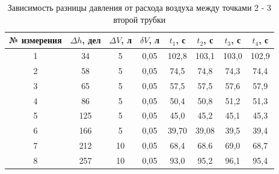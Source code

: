 \documentclass[11pt,a4paper]{article}
\begin{document}
\begin{enumerate}
\begin{table}[h!]
\centering
\begin{tabular}{|c|c|c|c|c|c|c|c|}
\hline
№ измерения & $\Delta h$, дел & $\Delta V$, л & $\delta V$, л & $t_{1}$, с & $t_{2}$, с & $t_{3}$, с & $t_{4}$, с \\ \hline
1           & 34              & 5             & 0,05          & 102,8      & 103,1      & 103,0     & 102,9      \\ \hline
2           & 58              & 5             & 0,05          & 74,5       & 74,8       & 74,3       & 74,4       \\ \hline
3           & 65              & 5             & 0,05          & 57,5       & 57,5      & 57,6      & 57,9     \\ \hline
4           & 86              & 5             & 0,05          & 50,4      & 50,8     & 51,2      & 51,3      \\ \hline
5           & 125             & 5             & 0,05          & 45,0     & 45,2       & 45,1      & 45,3     \\ \hline
6           & 166             & 5             & 0,05          & 39,70      & 39,08      & 39,5       & 39,4      \\ \hline
7           & 212             & 10             & 0,05          & 68,4      & 68.6     & 69,0     & 68,7      \\ \hline
8           & 257             & 10          & 0,05          & 93,0       & 95,2     & 96,1      & 95,4     \\ \hline
\end{tabular}
\caption{Зависимость разницы давления от расхода воздуха между точками 2 - 3 второй трубки}
\label{tab:flow_measuring_2_3_second_tube}
\end{table}


\end{enumerate}
\end{document}
